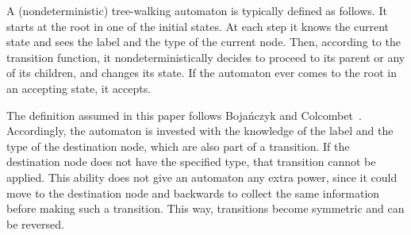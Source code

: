 \documentclass[12pt,a4paper]{article}
\theoremstyle{definition}
\begin{document}
A (nondeterministic) tree-walking automaton is typically defined as follows.
It starts at the root in one of the initial states.
At each step it knows the current state and sees the label and the type of the current node.
Then, according to the transition function, it nondeterministically decides
to proceed to its parent or any of its children,
and changes its state.
If the automaton ever comes to the root in an accepting state, it accepts.

The definition assumed in this paper follows Boja\'nczyk and Colcombet~\cite{BojanczykColcombet_reg}.
Accordingly, the automaton is invested
with the knowledge of the label and the type of the destination node,
which are also part of a transition.
If the destination node does not have the specified type, that transition cannot be applied.
This ability does not give an automaton any extra power, since it could move to 
the destination node and backwards to collect the same information before making such a transition.
This way, transitions become symmetric and can be reversed.
\end{document}
